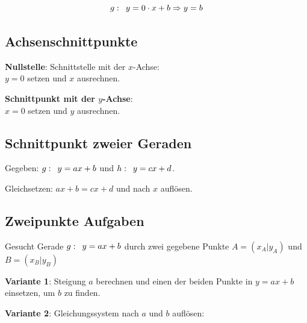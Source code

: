 \begin{multicols}{2}
$$g\-:\,\,\,  y=0\cdot{}x+b \Rightarrow y=b$$



\subsection*{Achsenschnittpunkte}

\textbf{Nullstelle}: Schnittstelle mit der $x$-Achse:\\
$y=0$ setzen und $x$ ausrechnen.



\textbf{Schnittpunkt mit der $y$-Achse}:\\
$x=0$ setzen und $y$ ausrechnen.


\subsection*{Schnittpunkt zweier Geraden}
Gegeben: $g\-:\,\,\, y=ax+b$ und $h\-:\,\,\, y=cx+d$.

Gleichsetzen: $ax+b = cx+d$ und nach $x$ auflösen.
\vspace{2cm}





\keinHeaderUndKeinFooter{}

\subsection*{Zweipunkte Aufgaben}
\keinHeaderUndKeinFooter{}

Gesucht Gerade $g\-: \,\,\, y=ax+b$ durch zwei gegebene Punkte $A=(x_A|y_A)$ und $B=(x_B|y_B)$

\textbf{Variante 1}: Steigung $a$ berechnen und einen der beiden Punkte in
$y=ax+b$ einsetzen, um $b$ zu finden.

\textbf{Variante 2}: Gleichungssystem nach $a$ und $b$ auf\/lösen:

\end{multicols}

